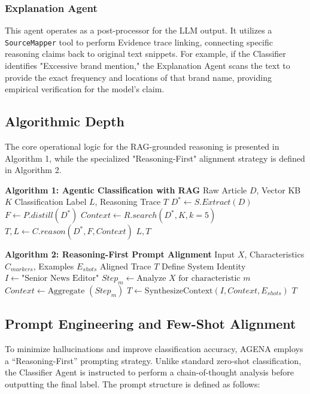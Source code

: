 \documentclass{ieeeaccess}
\begin{document}
\subsubsection{Explanation Agent}
This agent operates as a post-processor for the LLM output. It utilizes a \texttt{Source\allowbreak Mapper} tool to perform Evidence trace linking, connecting specific reasoning claims back to original text snippets. For example, if the Classifier identifies "Excessive brand mention," the Explanation Agent scans the text to provide the exact frequency and locations of that brand name, providing empirical verification for the model's claim.

\subsection{Algorithmic Depth}
The core operational logic for the RAG-grounded reasoning is presented in Algorithm 1, while the specialized "Reasoning-First" alignment strategy is defined in Algorithm 2.

\begin{algorithmic}
\STATE \textbf{Algorithm 1: Agentic Classification with RAG}
\REQUIRE Raw Article $D$, Vector KB $K$
\ENSURE Classification Label $L$, Reasoning Trace $T$
\STATE $D^* \leftarrow S.Extract(D)$ 
\STATE $F \leftarrow P.distill(D^*)$ 
\STATE $Context \leftarrow R.search(D^*, K, k=5)$ 
\STATE $T, L \leftarrow C.reason(D^*, F, Context)$ 
\RETURN $L, T$
\end{algorithmic}

\begin{algorithmic}
\STATE \textbf{Algorithm 2: Reasoning-First Prompt Alignment}
\REQUIRE Input $X$, Characteristics $C_{markers}$, Examples $E_{shots}$
\ENSURE Aligned Trace $T$
\STATE Define System Identity $I \leftarrow \text{"Senior News Editor"}$
    \STATE $Step_m \leftarrow \text{Analyze } X \text{ for characteristic } m$
\ENDFOR
\STATE $Context \leftarrow \text{Aggregate } (Step_m)$
\STATE $T \leftarrow \text{SynthesizeContext}(I, Context, E_{shots})$
\RETURN $T$
\end{algorithmic}

\subsection{Prompt Engineering and Few-Shot Alignment}
To minimize hallucinations and improve classification accuracy, AGENA employs a ``Reasoning-First'' prompting strategy. Unlike standard zero-shot classification, the Classifier Agent is instructed to perform a chain-of-thought analysis before outputting the final label. The prompt structure is defined as follows:
\end{document}
